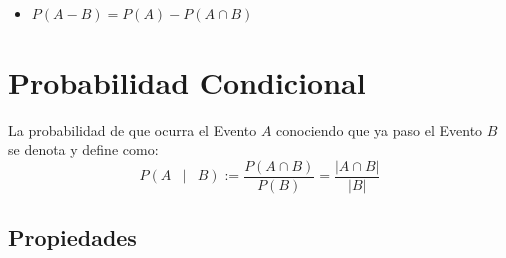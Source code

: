 \documentclass[12pt, fleqn]{report}                             %
\DeclareMathOperator \Space {\quad}                             %
\DeclareMathOperator \MiniSpace {\;}                            %
\newcommand \Such {\MiniSpace | \MiniSpace}                     %
\theoremstyle{break}                                            %
\newcommand{\Wrap}[1]{\left( #1 \right)}                        %
\newcommand{\Mag}[1]{\left| #1 \right|}                         %
\begin{document}
\begin{itemize}
                    \item
                        $P(A - B) = P(A) - P(A \cap B)$

                \end{itemize}


        \clearpage
        \section{Probabilidad Condicional}

            La probabilidad de que ocurra el Evento $A$ conociendo que ya paso
            el Evento $B$ se denota y define como:
            \begin{equation*}
                P \Wrap{ A \Such B}
                    := \frac{P(A \cap B)}{P(B)}
                    = \frac{\Mag{A \cap B}}{\Mag{B}}
            \end{equation*}

            \subsection{Propiedades}
\end{document}
